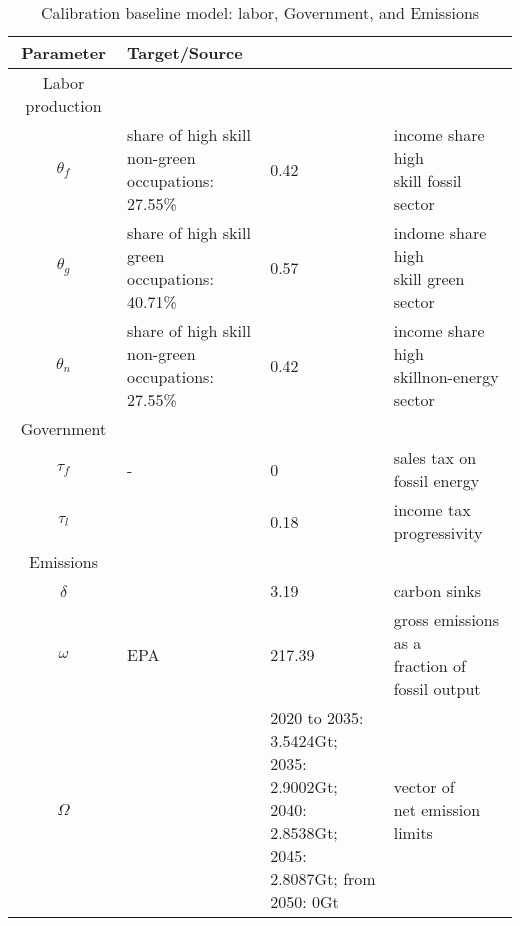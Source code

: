  \clearpage

 \begin{table}[hh!!!!!]
 	\begin{center}
 		\captionsetup{width=0.9\textwidth}
 		\caption{ Calibration baseline model: labor, Government, and Emissions}
 		\label{tab:calib2}
 		\begin{tabular}{c|lll}
 			\hline \hline
 			Parameter& Target/Source& \makecell[l]{Calibration}& \makecell[l]{Meaning}\\ 
 			\hline
 			\hline
 			Labor production&\multicolumn{3}{c}{}\\
 			\hline 
 			
 			\hline
 			$\theta_f$&\makecell[l]{share of high skill\\ non-green occupations: \\27.55\% }&0.42&\makecell[l]{income share high \\ skill fossil sector}\\
 			\hline
 			$\theta_g$&\makecell[l]{share of high skill\\ green occupations: \\40.71\% }&0.57&\makecell[l]{indome share high \\skill green sector}\\
 			\hline
 			$\theta_n$&\makecell[l]{share of high skill\\ non-green occupations: \\27.55\% }&0.42&\makecell[l]{income share high \\ skillnon-energy sector}\\
 			\hline
 			\hline
 			Government&\multicolumn{3}{c}{}\\
 			\hline
 			
 			\hline
 			$\tau_f$&- &0& sales tax on fossil energy\\
 			\hline
 			$\tau_l$&\cite{Heathcote2017OptimalFramework} &0.18& income tax progressivity\\
 			\hline	
 			\hline
 			Emissions&\multicolumn{3}{c}{}\\
 			\hline
 			
 			\hline
 			$\delta$& \makecell[l]{EPA}&3.19&carbon sinks \\
 			\hline
 			$\omega$& EPA&217.39& \makecell[l]{ gross emissions as a\\ fraction of fossil output}\\
 			\hline
 			$\Omega$& \cite{IPCC2022}&\makecell[l]{2020 to 2035: 3.5424Gt;\\ 2035: 2.9002Gt; 2040: 2.8538Gt; \\2045: 2.8087Gt; from 2050: 0Gt}& \makecell[l]{vector of \\ net emission limits}\\
 			\hline \hline
 		\end{tabular}
 	\end{center}
 \end{table}
